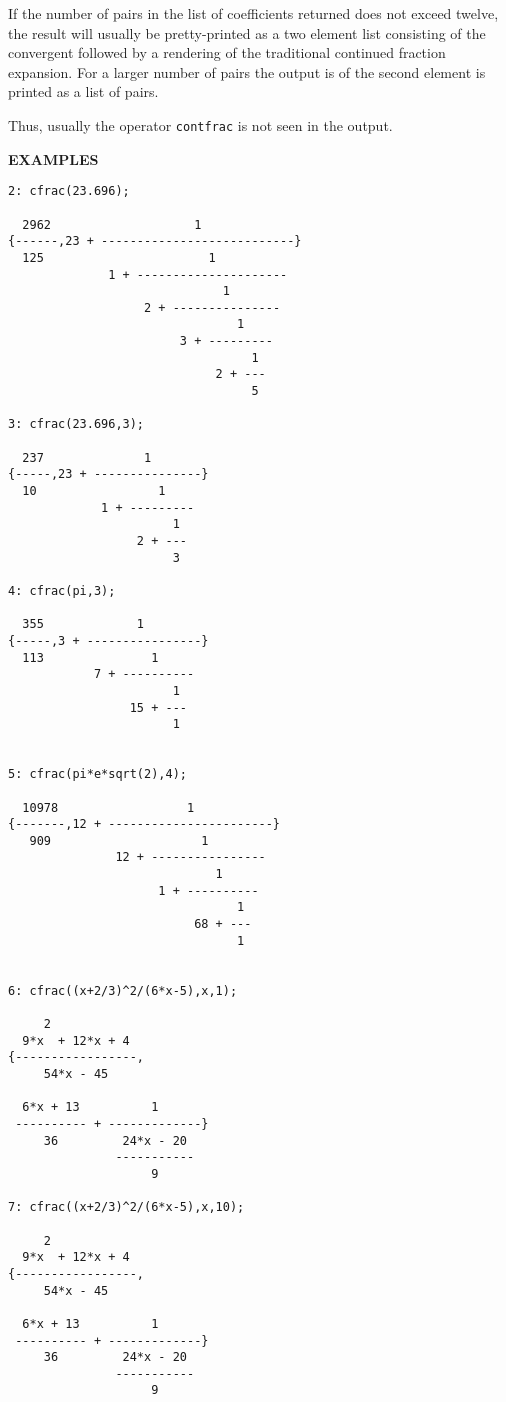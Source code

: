 If the number of pairs in the list of coefficients returned does not exceed
twelve, the result will usually be pretty-printed as a two element list
consisting of the convergent followed by a rendering of the traditional
continued fraction expansion. For a larger number of pairs the output is
of the second element is printed as a list of pairs.

Thus, usually the operator \texttt{contfrac} is not seen in the output.

\large{{\bf EXAMPLES}}
\begin{verbatim}
2: cfrac(23.696);

  2962                    1
{------,23 + ---------------------------}
  125                       1
              1 + ---------------------
                              1
                   2 + ---------------
                                1
                        3 + ---------
                                  1
                             2 + ---
                                  5

3: cfrac(23.696,3);

  237              1
{-----,23 + ---------------}
  10                 1
             1 + ---------
                       1
                  2 + ---
                       3

4: cfrac(pi,3);

  355             1
{-----,3 + ----------------}
  113               1
            7 + ----------
                       1
                 15 + ---
                       1


5: cfrac(pi*e*sqrt(2),4);

  10978                  1
{-------,12 + -----------------------}
   909                     1
               12 + ----------------
                             1
                     1 + ----------
                                1
                          68 + ---
                                1


6: cfrac((x+2/3)^2/(6*x-5),x,1);

     2
  9*x  + 12*x + 4
{-----------------,
     54*x - 45

  6*x + 13          1
 ---------- + -------------}
     36         24*x - 20
               -----------
                    9

7: cfrac((x+2/3)^2/(6*x-5),x,10);

     2
  9*x  + 12*x + 4
{-----------------,
     54*x - 45

  6*x + 13          1
 ---------- + -------------}
     36         24*x - 20
               -----------
                    9


\end{verbatim}
